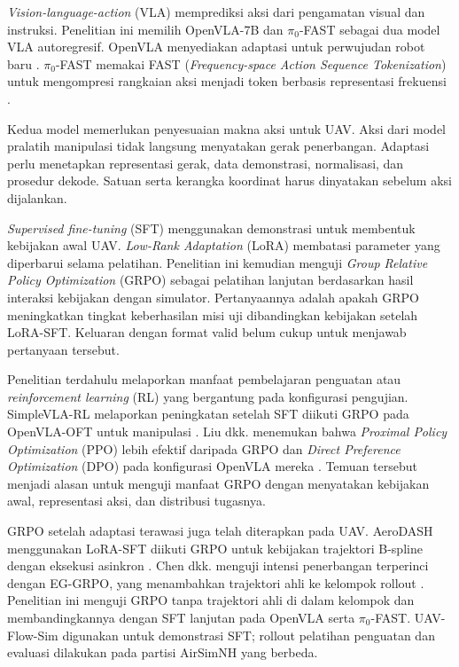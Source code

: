 \textit{Vision-language-action} (VLA) memprediksi aksi dari pengamatan visual dan instruksi. Penelitian ini memilih OpenVLA-7B dan $\pi_0$-FAST sebagai dua model VLA autoregresif. OpenVLA menyediakan adaptasi untuk perwujudan robot baru \citep{kim2024openvla}. $\pi_0$-FAST memakai FAST (\textit{Frequency-space Action Sequence Tokenization}) untuk mengompresi rangkaian aksi menjadi token berbasis representasi frekuensi \citep{pertsch2025fast}.

Kedua model memerlukan penyesuaian makna aksi untuk UAV. Aksi dari model pralatih manipulasi tidak langsung menyatakan gerak penerbangan. Adaptasi perlu menetapkan representasi gerak, data demonstrasi, normalisasi, dan prosedur dekode. Satuan serta kerangka koordinat harus dinyatakan sebelum aksi dijalankan.

\textit{Supervised fine-tuning} (SFT) menggunakan demonstrasi untuk membentuk kebijakan awal UAV. \textit{Low-Rank Adaptation} (LoRA) membatasi parameter yang diperbarui selama pelatihan. Penelitian ini kemudian menguji \textit{Group Relative Policy Optimization} (GRPO) sebagai pelatihan lanjutan berdasarkan hasil interaksi kebijakan dengan simulator. Pertanyaannya adalah apakah GRPO meningkatkan tingkat keberhasilan misi uji dibandingkan kebijakan setelah LoRA-SFT. Keluaran dengan format valid belum cukup untuk menjawab pertanyaan tersebut.

Penelitian terdahulu melaporkan manfaat pembelajaran penguatan atau \textit{reinforcement learning} (RL) yang bergantung pada konfigurasi pengujian. SimpleVLA-RL melaporkan peningkatan setelah SFT diikuti GRPO pada OpenVLA-OFT untuk manipulasi \citep{li2026simplevlarl}. Liu dkk. menemukan bahwa \textit{Proximal Policy Optimization} (PPO) lebih efektif daripada GRPO dan \textit{Direct Preference Optimization} (DPO) pada konfigurasi OpenVLA mereka \citep{liu2025rlvla}. Temuan tersebut menjadi alasan untuk menguji manfaat GRPO dengan menyatakan kebijakan awal, representasi aksi, dan distribusi tugasnya.

GRPO setelah adaptasi terawasi juga telah diterapkan pada UAV. AeroDASH menggunakan LoRA-SFT diikuti GRPO untuk kebijakan trajektori B-spline dengan eksekusi asinkron \citep{liu2026aerodash}. Chen dkk. menguji intensi penerbangan terperinci dengan EG-GRPO, yang menambahkan trajektori ahli ke kelompok rollout \citep{chen2026eggrpo}. Penelitian ini menguji GRPO tanpa trajektori ahli di dalam kelompok dan membandingkannya dengan SFT lanjutan pada OpenVLA serta $\pi_0$-FAST. UAV-Flow-Sim digunakan untuk demonstrasi SFT; rollout pelatihan penguatan dan evaluasi dilakukan pada partisi AirSimNH yang berbeda.

